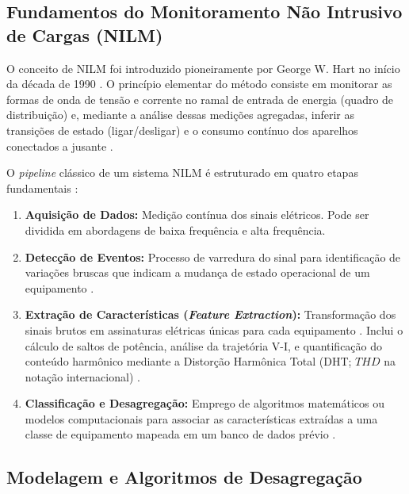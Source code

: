 \documentclass[12pt]{article}
\begin{document}
\subsection{Fundamentos do Monitoramento N\~ao Intrusivo de Cargas (NILM)}

O conceito de NILM foi introduzido pioneiramente por George W. Hart no in\'icio da
d\'ecada de 1990 \citep{ref1}. O princ\'ipio elementar do m\'etodo consiste em
monitorar as formas de onda de tens\~ao e corrente no ramal de entrada de energia
(quadro de distribui\c{c}\~ao) e, mediante a an\'alise dessas medi\c{c}\~oes
agregadas, inferir as transi\c{c}\~oes de estado (ligar/desligar) e o consumo
cont\'inuo dos aparelhos conectados a jusante \citep{ref1}.

O \textit{pipeline} cl\'assico de um sistema NILM \'e estruturado em quatro etapas
fundamentais \citep{ref2,ref7}:

\begin{enumerate}
  \item \textbf{Aquisi\c{c}\~ao de Dados:} Medi\c{c}\~ao cont\'inua dos sinais
  el\'etricos. Pode ser dividida em abordagens de baixa frequ\^encia \citep{ref3}
  e alta frequ\^encia.

  \item \textbf{Detec\c{c}\~ao de Eventos:} Processo de varredura do sinal para
  identifica\c{c}\~ao de varia\c{c}\~oes bruscas que indicam a mudan\c{c}a de
  estado operacional de um equipamento \citep{ref2}.

  \item \textbf{Extra\c{c}\~ao de Caracter\'isticas (\textit{Feature
  Extraction}):} Transforma\c{c}\~ao dos sinais brutos em assinaturas el\'etricas
  \'unicas para cada equipamento \citep{ref2}. Inclui o c\'alculo de saltos de
  pot\^encia, an\'alise da trajet\'oria V-I, e quantifica\c{c}\~ao do conte\'udo
  harm\^onico mediante a Distor\c{c}\~ao Harm\^onica Total (DHT;
  $THD$ na nota\c{c}\~ao internacional) \citep{ref8}.

  \item \textbf{Classifica\c{c}\~ao e Desagrega\c{c}\~ao:} Emprego de algoritmos
  matem\'aticos ou modelos computacionais para associar as caracter\'isticas
  extra\'idas a uma classe de equipamento mapeada em um banco de dados pr\'evio
  \citep{ref4,ref6}.
\end{enumerate}

\subsection{Modelagem e Algoritmos de Desagrega\c{c}\~ao}
\end{document}
